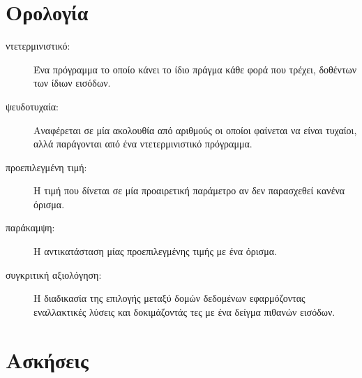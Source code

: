 \documentclass[10pt]{book}
\begin{document}
\section{Ορολογία}

\begin{description}

\item[ντετερμινιστικό:] Ένα πρόγραμμα το οποίο κάνει το ίδιο πράγμα κάθε φορά που τρέχει, δοθέντων των ίδιων εισόδων.

\item[ψευδοτυχαία:] Αναφέρεται σε μία ακολουθία από αριθμούς οι οποίοι φαίνεται να είναι τυχαίοι, αλλά παράγονται από ένα ντετερμινιστικό πρόγραμμα.

\item[προεπιλεγμένη τιμή:] Η τιμή που δίνεται σε μία προαιρετική παράμετρο αν δεν παρασχεθεί κανένα όρισμα.

\item[παράκαμψη:] Η αντικατάσταση μίας προεπιλεγμένης τιμής με ένα όρισμα.

\item[συγκριτική αξιολόγηση:] Η διαδικασία της επιλογής μεταξύ δομών δεδομένων εφαρμόζοντας εναλλακτικές λύσεις και δοκιμάζοντάς τες με ένα δείγμα πιθανών εισόδων.

\end{description}


\section{Ασκήσεις}
\end{document}
